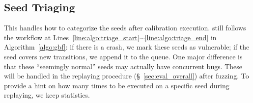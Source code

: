 \subsection{Seed Triaging}\label{sec:seed_save}
This handles how to categorize the seeds after calibration execution. \mtfuzz still follows the workflow at Lines~\ref{line:algo:triage_start}$\sim$\ref{line:algo:triage_end} in Algorithm~\ref{algo:gbf}: if there is a crash, we mark these seeds as vulnerable; if the seed covers new transitions, we append it to the queue. One major difference is that these ``seemingly normal'' seeds may actually have concurrent bugs. These will be handled in the replaying procedure (\S~\ref{sec:eval_overall}) after fuzzing. To provide a hint on how many times to be executed on a specific seed during replaying, we keep \NcalTrace statistics.



